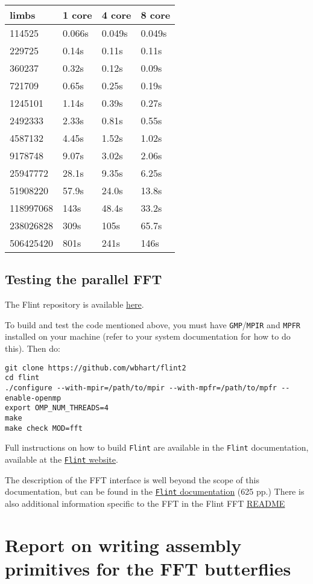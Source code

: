\begin{longtable}[c]{@{}llll@{}}
\toprule
limbs & 1 core & 4 core & 8 core\tabularnewline
\midrule
\endhead
114525 & 0.066s & 0.049s & 0.049s\tabularnewline
229725 & 0.14s & 0.11s & 0.11s\tabularnewline
360237 & 0.32s & 0.12s & 0.09s\tabularnewline
721709 & 0.65s & 0.25s & 0.19s\tabularnewline
1245101 & 1.14s & 0.39s & 0.27s\tabularnewline
2492333 & 2.33s & 0.81s & 0.55s\tabularnewline
4587132 & 4.45s & 1.52s & 1.02s\tabularnewline
9178748 & 9.07s & 3.02s & 2.06s\tabularnewline
25947772 & 28.1s & 9.35s & 6.25s\tabularnewline
51908220 & 57.9s & 24.0s & 13.8s\tabularnewline
118997068 & 143s & 48.4s & 33.2s\tabularnewline
238026828 & 309s & 105s & 65.7s\tabularnewline
506425420 & 801s & 241s & 146s\tabularnewline
\bottomrule
\end{longtable}

\subsection{Testing the parallel FFT}\label{testing-the-parallel-fft}

The Flint repository is available
\href{https://github.com/wbhart/flint2}{here}.

To build and test the code mentioned above, you must have
\texttt{GMP}/\texttt{MPIR} and \texttt{MPFR} installed on your machine
(refer to your system documentation for how to do this). Then do:

\begin{verbatim}
git clone https://github.com/wbhart/flint2
cd flint
./configure --with-mpir=/path/to/mpir --with-mpfr=/path/to/mpfr --enable-openmp
export OMP_NUM_THREADS=4
make
make check MOD=fft
\end{verbatim}

Full instructions on how to build \texttt{Flint} are available in the
\texttt{Flint} documentation, available at the
\href{http://flintlib.org/}{\texttt{Flint} website}.

The description of the FFT interface is well beyond the scope of this
documentation, but can be found in the
\href{http://flintlib.org/flint-2.5.pdf}{\texttt{Flint} documentation}
(625 pp.) There is also additional information specific to the FFT in
the Flint FFT
\href{https://github.com/wbhart/flint2/tree/trunk/fft}{README}

\section{Report on writing assembly primitives for the FFT
butterflies}\label{report-on-writing-assembly-primitives-for-the-fft-butterflies}

